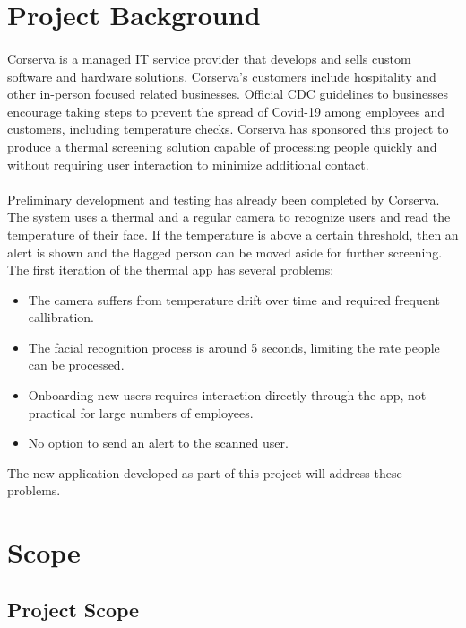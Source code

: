 \documentclass[12pt, letterpaper]{article}
\begin{document}
    
    \newpage
    \tableofcontents
    \newpage
    \listoffigures
    \newpage
    \section{Project Background}
    \paragraph{}
    Corserva is a managed IT service provider that develops and sells custom software and hardware solutions. Corserva's customers
    include hospitality and other in-person focused related businesses. Official CDC guidelines to businesses encourage taking steps to 
    prevent the spread of Covid-19 among employees and customers, including temperature checks. Corserva has sponsored this project 
    to produce a thermal screening solution capable of processing people quickly and without requiring user interaction to minimize additional
    contact.
    \paragraph{}
    Preliminary development and testing has already been completed by Corserva. The system uses a thermal and a regular camera to 
    recognize users and read the temperature of their face. If the temperature is above a certain threshold, then an alert is shown and 
    the flagged person can be moved aside for further screening.  The first iteration of the thermal app has several problems:
    \begin{itemize}
        \item The camera suffers from temperature drift over time and required frequent callibration.
        \item The facial recognition process is around 5 seconds, limiting the rate people can be processed.
        \item Onboarding new users requires interaction directly through the app, not practical for large numbers of employees.
        \item No option to send an alert to the scanned user.
    \end{itemize}
    The new application developed as part of this project will address these problems.
    \section{Scope}
    \subsection{Project Scope}
\end{document}
